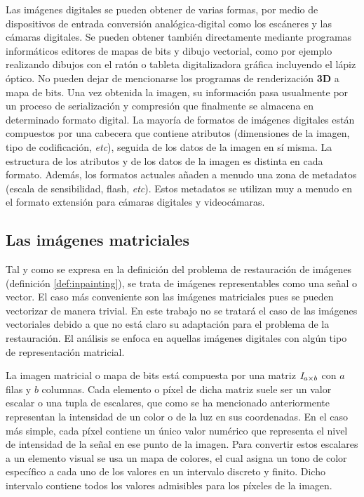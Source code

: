 Las imágenes digitales se pueden obtener de varias formas, por medio de dispositivos de entrada conversión analógica-digital como los escáneres y las cámaras digitales. Se pueden obtener tambi\'en directamente mediante programas informáticos editores de mapas de bits y dibujo vectorial, como por ejemplo realizando dibujos con el ratón o tableta digitalizadora gráfica incluyendo el lápiz óptico. No pueden dejar de mencionarse los programas de renderización \textbf{3D} a mapa de bits. Una vez obtenida la imagen, su informaci\'on pasa usualmente por un proceso de serializaci\'on y compresi\'on que finalmente se almacena en determinado formato digital. La mayoría de formatos de imágenes digitales están compuestos por una cabecera que contiene atributos (dimensiones de la imagen, tipo de codificación, \textit{etc}), seguida de los datos de la imagen en sí misma. La estructura de los atributos y de los datos de la imagen es distinta en cada formato. Además, los formatos actuales añaden a menudo una zona de metadatos (escala de sensibilidad, flash, \textit{etc}). Estos metadatos se utilizan muy a menudo en el formato extensión para cámaras digitales y videocámaras.

\subsection{Las im\'agenes matriciales}

Tal y como se expresa en la definici\'on del problema de restauraci\'on de im\'agenes (definici\'on \ref{def:inpainting}), se trata de im\'agenes representables como una señal o vector. El caso m\'as conveniente son las im\'agenes matriciales pues se pueden vectorizar de manera trivial. En este trabajo no se tratar\'a el caso de las im\'agenes vectoriales debido a que no est\'a claro su adaptaci\'on para el problema de la restauraci\'on. El análisis se enfoca en aquellas im\'agenes digitales con alg\'un tipo de representaci\'on matricial.

La imagen matricial o mapa de bits est\'a compuesta por una matriz $\mathbb{\mathit{I}}_{a \times b}$ con $a$ filas y $b$ columnas. Cada elemento o p\'ixel de dicha matriz suele ser un valor escalar o una tupla de escalares, que como se ha mencionado anteriormente representan la intensidad de un color o de la luz en sus coordenadas. En el caso más simple, cada píxel contiene un único valor numérico que representa el nivel de intensidad de la señal en ese punto de la imagen. Para convertir estos escalares a un elemento visual se usa un mapa de colores, el cual asigna un tono de color espec\'ifico a cada uno de los valores en un intervalo discreto y finito. Dicho intervalo contiene todos los valores admisibles para los p\'ixeles de la imagen.

